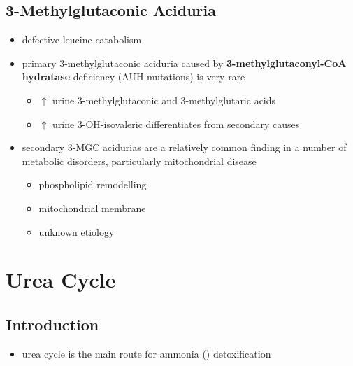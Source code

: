 \documentclass{scrartcl}
\begin{document}
\subsection{3-Methylglutaconic Aciduria}
\label{sec:org730c49e}
\begin{itemize}
\item defective leucine catabolism
\item primary 3-methylglutaconic aciduria caused by \textbf{3-methylglutaconyl-CoA}
\textbf{hydratase} deficiency (AUH mutations) is very rare
\begin{itemize}
\item \(\uparrow\) urine 3-methylglutaconic and 3-methylglutaric acids
\item \(\uparrow\) urine 3-OH-isovaleric differentiates from secondary causes
\end{itemize}
\end{itemize}
\begin{itemize}
\item secondary 3-MGC acidurias are a relatively common finding in a
number of metabolic disorders, particularly mitochondrial disease
\begin{itemize}
\item phospholipid remodelling
\item mitochondrial membrane
\item unknown etiology
\end{itemize}
\end{itemize}

\section{Urea Cycle}
\label{sec:org71718cd}
\subsection{Introduction}
\label{sec:org09add14}
\begin{itemize}
\item urea cycle is the main route for ammonia () detoxification
\end{itemize}

\chemnameinit{}
\chemnameinit{}

\chemnameinit{}
\end{document}
